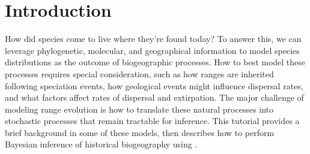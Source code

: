 \section*{Introduction}

How did species come to live where they're found today?
To answer this, we can leverage phylogenetic, molecular, and geographical information to model species distributions as the outcome of biogeographic processes.
How to best model these processes requires special consideration, such as how ranges are inherited following speciation events, how geological events might influence dispersal rates, and what factors affect rates of dispersal and extirpation.
The major challenge of modeling range evolution is how to translate these natural processes into stochastic processes that remain tractable for inference.
This tutorial provides a brief background in some of these models, then describes how to perform Bayesian inference of historical biogeography using \RevBayes.

